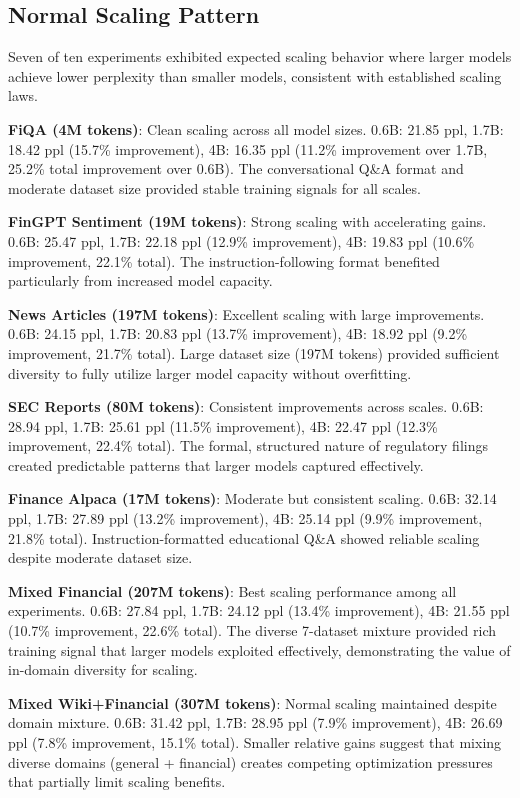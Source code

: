 \subsection{Normal Scaling Pattern}

Seven of ten experiments exhibited expected scaling behavior where larger models achieve lower perplexity than smaller models, consistent with established scaling laws.

\textbf{FiQA (4M tokens)}: Clean scaling across all model sizes. 0.6B: 21.85 ppl, 1.7B: 18.42 ppl (15.7\% improvement), 4B: 16.35 ppl (11.2\% improvement over 1.7B, 25.2\% total improvement over 0.6B). The conversational Q\&A format and moderate dataset size provided stable training signals for all scales.

\textbf{FinGPT Sentiment (19M tokens)}: Strong scaling with accelerating gains. 0.6B: 25.47 ppl, 1.7B: 22.18 ppl (12.9\% improvement), 4B: 19.83 ppl (10.6\% improvement, 22.1\% total). The instruction-following format benefited particularly from increased model capacity.

\textbf{News Articles (197M tokens)}: Excellent scaling with large improvements. 0.6B: 24.15 ppl, 1.7B: 20.83 ppl (13.7\% improvement), 4B: 18.92 ppl (9.2\% improvement, 21.7\% total). Large dataset size (197M tokens) provided sufficient diversity to fully utilize larger model capacity without overfitting.

\textbf{SEC Reports (80M tokens)}: Consistent improvements across scales. 0.6B: 28.94 ppl, 1.7B: 25.61 ppl (11.5\% improvement), 4B: 22.47 ppl (12.3\% improvement, 22.4\% total). The formal, structured nature of regulatory filings created predictable patterns that larger models captured effectively.

\textbf{Finance Alpaca (17M tokens)}: Moderate but consistent scaling. 0.6B: 32.14 ppl, 1.7B: 27.89 ppl (13.2\% improvement), 4B: 25.14 ppl (9.9\% improvement, 21.8\% total). Instruction-formatted educational Q\&A showed reliable scaling despite moderate dataset size.

\textbf{Mixed Financial (207M tokens)}: Best scaling performance among all experiments. 0.6B: 27.84 ppl, 1.7B: 24.12 ppl (13.4\% improvement), 4B: 21.55 ppl (10.7\% improvement, 22.6\% total). The diverse 7-dataset mixture provided rich training signal that larger models exploited effectively, demonstrating the value of in-domain diversity for scaling.

\textbf{Mixed Wiki+Financial (307M tokens)}: Normal scaling maintained despite domain mixture. 0.6B: 31.42 ppl, 1.7B: 28.95 ppl (7.9\% improvement), 4B: 26.69 ppl (7.8\% improvement, 15.1\% total). Smaller relative gains suggest that mixing diverse domains (general + financial) creates competing optimization pressures that partially limit scaling benefits.

